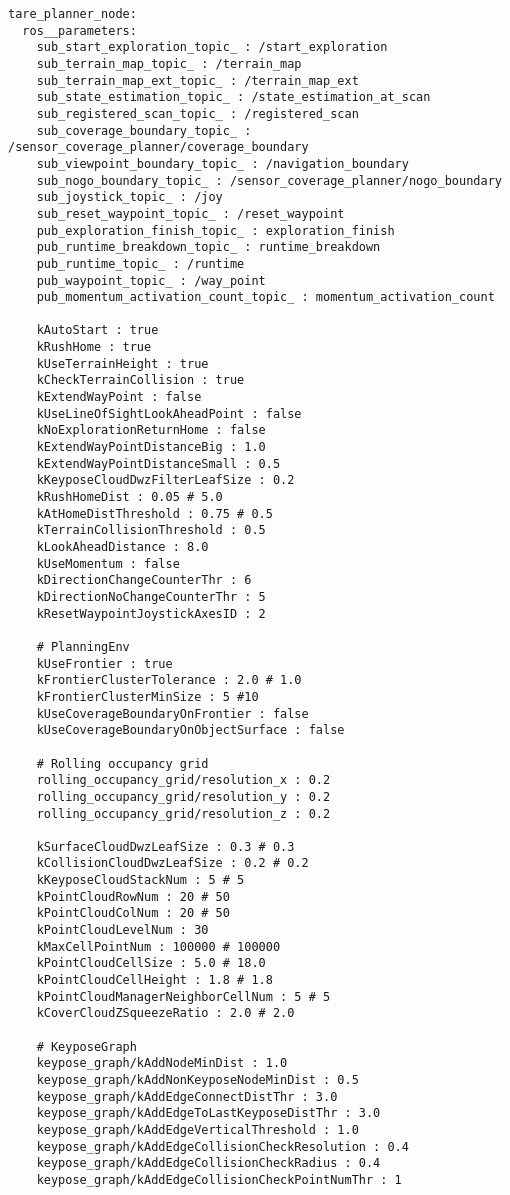 \begin{lstlisting}[style=yaml, caption={TARE planner parameter configuration for Unitree GO2}, label={lst:tare_config}]
tare_planner_node:
  ros__parameters:
    sub_start_exploration_topic_ : /start_exploration
    sub_terrain_map_topic_ : /terrain_map
    sub_terrain_map_ext_topic_ : /terrain_map_ext
    sub_state_estimation_topic_ : /state_estimation_at_scan
    sub_registered_scan_topic_ : /registered_scan
    sub_coverage_boundary_topic_ : /sensor_coverage_planner/coverage_boundary
    sub_viewpoint_boundary_topic_ : /navigation_boundary
    sub_nogo_boundary_topic_ : /sensor_coverage_planner/nogo_boundary
    sub_joystick_topic_ : /joy
    sub_reset_waypoint_topic_ : /reset_waypoint
    pub_exploration_finish_topic_ : exploration_finish
    pub_runtime_breakdown_topic_ : runtime_breakdown
    pub_runtime_topic_ : /runtime
    pub_waypoint_topic_ : /way_point
    pub_momentum_activation_count_topic_ : momentum_activation_count

    kAutoStart : true
    kRushHome : true
    kUseTerrainHeight : true
    kCheckTerrainCollision : true
    kExtendWayPoint : false
    kUseLineOfSightLookAheadPoint : false
    kNoExplorationReturnHome : false
    kExtendWayPointDistanceBig : 1.0
    kExtendWayPointDistanceSmall : 0.5  
    kKeyposeCloudDwzFilterLeafSize : 0.2
    kRushHomeDist : 0.05 # 5.0
    kAtHomeDistThreshold : 0.75 # 0.5
    kTerrainCollisionThreshold : 0.5
    kLookAheadDistance : 8.0
    kUseMomentum : false 
    kDirectionChangeCounterThr : 6
    kDirectionNoChangeCounterThr : 5
    kResetWaypointJoystickAxesID : 2

    # PlanningEnv
    kUseFrontier : true
    kFrontierClusterTolerance : 2.0 # 1.0
    kFrontierClusterMinSize : 5 #10
    kUseCoverageBoundaryOnFrontier : false
    kUseCoverageBoundaryOnObjectSurface : false

    # Rolling occupancy grid
    rolling_occupancy_grid/resolution_x : 0.2
    rolling_occupancy_grid/resolution_y : 0.2
    rolling_occupancy_grid/resolution_z : 0.2

    kSurfaceCloudDwzLeafSize : 0.3 # 0.3
    kCollisionCloudDwzLeafSize : 0.2 # 0.2
    kKeyposeCloudStackNum : 5 # 5
    kPointCloudRowNum : 20 # 50
    kPointCloudColNum : 20 # 50
    kPointCloudLevelNum : 30
    kMaxCellPointNum : 100000 # 100000
    kPointCloudCellSize : 5.0 # 18.0
    kPointCloudCellHeight : 1.8 # 1.8
    kPointCloudManagerNeighborCellNum : 5 # 5
    kCoverCloudZSqueezeRatio : 2.0 # 2.0

    # KeyposeGraph
    keypose_graph/kAddNodeMinDist : 1.0
    keypose_graph/kAddNonKeyposeNodeMinDist : 0.5
    keypose_graph/kAddEdgeConnectDistThr : 3.0
    keypose_graph/kAddEdgeToLastKeyposeDistThr : 3.0
    keypose_graph/kAddEdgeVerticalThreshold : 1.0
    keypose_graph/kAddEdgeCollisionCheckResolution : 0.4
    keypose_graph/kAddEdgeCollisionCheckRadius : 0.4
    keypose_graph/kAddEdgeCollisionCheckPointNumThr : 1


\end{lstlisting}
